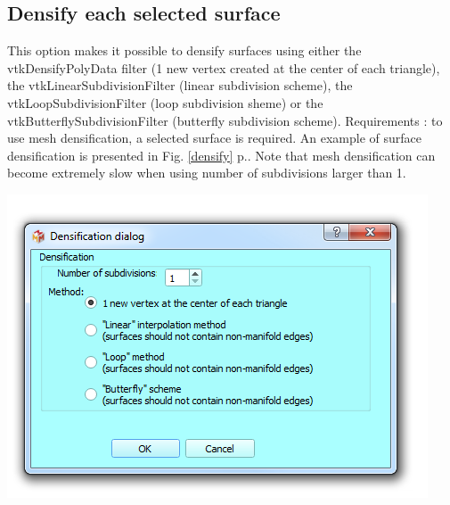 \subsection{Densify each selected surface}

\noindent
\begin{minipage}{0.5\textwidth}

This option makes it possible to densify surfaces using either the vtkDensifyPolyData filter (1 new vertex created at the center of each triangle), the vtkLinearSubdivisionFilter (linear subdivision scheme), the vtkLoopSubdivisionFilter (loop subdivision sheme) or the vtkButterflySubdivisionFilter (butterfly subdivision scheme).
Requirements : to use mesh densification, a selected
surface is required. An example of surface densification is presented in Fig. \ref{densify} p.\pageref{densify}.
Note that mesh densification can become extremely slow
when using number of subdivisions larger than 1.

\end{minipage}    
\begin{minipage}{0.5\textwidth}\centering
  \includegraphics[scale=0.5]{images/09/structure/densification_dialog.png}
 \end{minipage} 
\noindent

